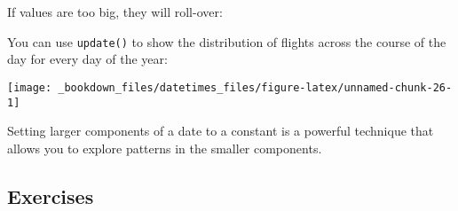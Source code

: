 \documentclass[]{book}
\newenvironment{Shaded}{\begin{snugshade}}{\end{snugshade}}
\newcommand{\KeywordTok}[1]{\textcolor[rgb]{0.13,0.29,0.53}{\textbf{{#1}}}}
\newcommand{\DataTypeTok}[1]{\textcolor[rgb]{0.13,0.29,0.53}{{#1}}}
\newcommand{\DecValTok}[1]{\textcolor[rgb]{0.00,0.00,0.81}{{#1}}}
\newcommand{\StringTok}[1]{\textcolor[rgb]{0.31,0.60,0.02}{{#1}}}
\newcommand{\CommentTok}[1]{\textcolor[rgb]{0.56,0.35,0.01}{\textit{{#1}}}}
\newcommand{\NormalTok}[1]{{#1}}
\begin{document}
If values are too big, they will roll-over:

\begin{Shaded}
\end{Shaded}

You can use \texttt{update()} to show the distribution of flights across
the course of the day for every day of the year:

\begin{Shaded}
\end{Shaded}

\begin{center}\texttt{[image: \_bookdown\_files/datetimes\_files/figure-latex/unnamed-chunk-26-1]} \end{center}

Setting larger components of a date to a constant is a powerful
technique that allows you to explore patterns in the smaller components.

\subsection{Exercises}\label{exercises-46}
\end{document}
